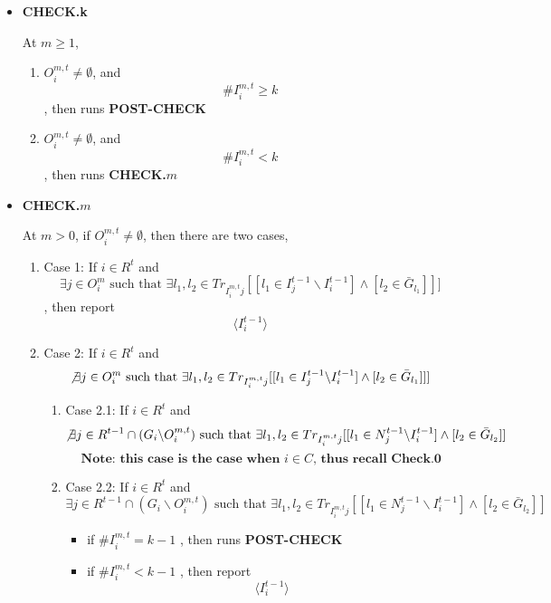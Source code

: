 \documentclass[12pt,letterpaper]{article}
\newtheorem*{main result}{Main Result}
\theoremstyle{definition}
\theoremstyle{remark}
\theoremstyle{claim}
\begin{document}
\begin{itemize}
\begin{enumerate}
\begin{itemize}
\end{itemize}
\end{enumerate}






\item \textbf{CHECK.k}

At $m\geq 1$, 
\begin{enumerate}


\item $O^{m,t}_i\neq \emptyset$, and
 \[\# I^{m,t}_i\geq k\]
, then runs
\textbf{POST-CHECK }

\item $O^{m,t}_i\neq \emptyset$, and 
\[ \#I^{m,t}_i< k\]
, then runs \textbf{CHECK.$m$}
\end{enumerate}


\item \textbf{CHECK.$m$}

 At $m>0$, if $O^{m,t}_i\neq \emptyset$, then there are two cases, 
\begin{enumerate}
\item Case 1: If $i\in R^t$ and 
\[\exists j\in  O^m_i \text{ such that }\exists l_1,l_2\in Tr_{I^{m,t}_ij}[[l_1\in I^{t-1}_j\backslash I^{t-1}_i] \wedge [l_2\in \bar{G}_{l_1}]]]\]
, then report 
\[\langle I^{t-1}_i \rangle\]
\item Case 2: If $i\in R^t$ and 
\[\not\exists j\in  O^m_i \text{ such that }\exists l_1,l_2\in Tr_{I^{m,t}_ij}[[l_1\in I^{t-1}_j\backslash I^{t-1}_i] \wedge [l_2\in \bar{G}_{l_1}]]]\]

\begin{enumerate}
\item Case 2.1: If $i\in R^t$ and 
\[\not\exists j\in R^{t-1}\cap (G_i\backslash  O^{m,t}_i) \text{ such that }\exists l_1,l_2\in Tr_{I^{m,t}_ij}[[l_1\in N^{t-1}_j\backslash I^{t-1}_i] \wedge [l_2\in \bar{G}_{l_2}]]\]
\[\textbf{Note: this case is the case when $i\in C$, thus recall Check.0}\]

\item Case 2.2: If $i\in R^t$ and 
\[\exists j\in R^{t-1}\cap (G_i\backslash  O^{m,t}_i) \text{ such that }\exists l_1,l_2\in Tr_{I^{m,t}_ij}[[l_1\in N^{t-1}_j\backslash I^{t-1}_i] \wedge [l_2\in \bar{G}_{l_2}]]\]

\begin{itemize}
\item if $\# I^{m,t}_i= k-1$
, then runs
\textbf{POST-CHECK }

\item if $\# I^{m,t}_i< k-1$
, then report 
\[\langle I^{t-1}_i \rangle\]
\end{itemize}






\end{enumerate}
\end{enumerate}
\end{itemize}
\end{document}
